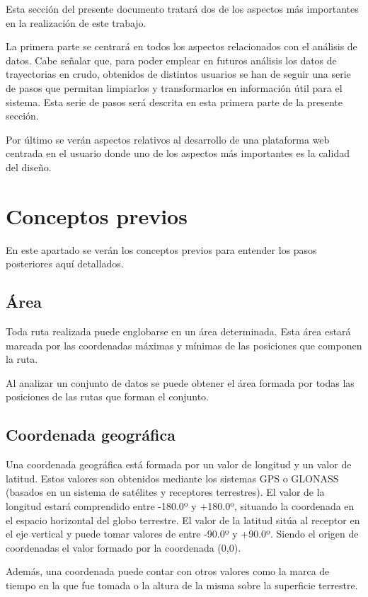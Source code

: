 
Esta sección del presente documento tratará dos de los aspectos más importantes en la realización de este trabajo.

La primera parte se centrará en todos los aspectos relacionados con el análisis de datos. Cabe señalar que, para poder emplear en futuros análisis los datos de trayectorias en crudo, obtenidos de distintos usuarios se han de seguir una serie de pasos que permitan limpiarlos y transformarlos en información útil para el sistema. Esta serie de pasos será descrita en esta primera parte de la presente sección.

Por último se verán aspectos relativos al desarrollo de una plataforma web centrada en el usuario donde uno de los aspectos más importantes es la calidad del diseño.



\section{Conceptos previos}
En este apartado se verán los conceptos previos para entender los pasos posteriores aquí detallados.

\subsection{Área}
Toda ruta realizada puede englobarse en un área determinada. Esta área estará marcada por las coordenadas máximas y mínimas de las posiciones que componen la ruta.

Al analizar un conjunto de datos se puede obtener el área formada por todas las posiciones de las rutas que forman el conjunto.

\subsection{Coordenada geográfica}
Una coordenada geográfica está formada por un valor de longitud y un valor de latitud. Estos valores son obtenidos mediante los sistemas GPS o GLONASS (basados en un sistema de satélites y receptores terrestres). El valor de la longitud estará comprendido entre -180.0º y +180.0º, situando la coordenada en el espacio horizontal del globo terrestre. El valor de la latitud sitúa al receptor en el eje vertical y puede tomar valores de entre -90.0º y +90.0º. Siendo el origen de coordenadas el valor formado por la coordenada (0,0).

Además, una coordenada puede contar con otros valores como la marca de tiempo en la que fue tomada o la altura de la misma sobre la superficie terrestre.

